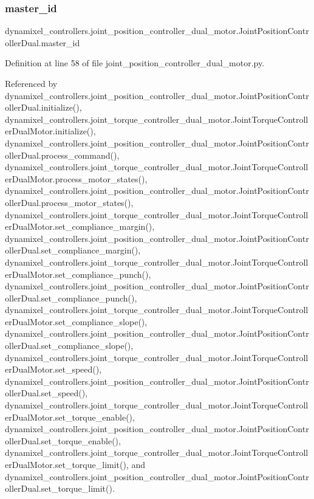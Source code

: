 \subsubsection{\texorpdfstring{master\+\_\+id}{master\_id}}
{\footnotesize\ttfamily dynamixel\+\_\+controllers.\+joint\+\_\+position\+\_\+controller\+\_\+dual\+\_\+motor.\+Joint\+Position\+Controller\+Dual.\+master\+\_\+id}



Definition at line 58 of file joint\+\_\+position\+\_\+controller\+\_\+dual\+\_\+motor.\+py.



Referenced by dynamixel\+\_\+controllers.\+joint\+\_\+position\+\_\+controller\+\_\+dual\+\_\+motor.\+Joint\+Position\+Controller\+Dual.\+initialize(), dynamixel\+\_\+controllers.\+joint\+\_\+torque\+\_\+controller\+\_\+dual\+\_\+motor.\+Joint\+Torque\+Controller\+Dual\+Motor.\+initialize(), dynamixel\+\_\+controllers.\+joint\+\_\+position\+\_\+controller\+\_\+dual\+\_\+motor.\+Joint\+Position\+Controller\+Dual.\+process\+\_\+command(), dynamixel\+\_\+controllers.\+joint\+\_\+torque\+\_\+controller\+\_\+dual\+\_\+motor.\+Joint\+Torque\+Controller\+Dual\+Motor.\+process\+\_\+motor\+\_\+states(), dynamixel\+\_\+controllers.\+joint\+\_\+position\+\_\+controller\+\_\+dual\+\_\+motor.\+Joint\+Position\+Controller\+Dual.\+process\+\_\+motor\+\_\+states(), dynamixel\+\_\+controllers.\+joint\+\_\+torque\+\_\+controller\+\_\+dual\+\_\+motor.\+Joint\+Torque\+Controller\+Dual\+Motor.\+set\+\_\+compliance\+\_\+margin(), dynamixel\+\_\+controllers.\+joint\+\_\+position\+\_\+controller\+\_\+dual\+\_\+motor.\+Joint\+Position\+Controller\+Dual.\+set\+\_\+compliance\+\_\+margin(), dynamixel\+\_\+controllers.\+joint\+\_\+torque\+\_\+controller\+\_\+dual\+\_\+motor.\+Joint\+Torque\+Controller\+Dual\+Motor.\+set\+\_\+compliance\+\_\+punch(), dynamixel\+\_\+controllers.\+joint\+\_\+position\+\_\+controller\+\_\+dual\+\_\+motor.\+Joint\+Position\+Controller\+Dual.\+set\+\_\+compliance\+\_\+punch(), dynamixel\+\_\+controllers.\+joint\+\_\+torque\+\_\+controller\+\_\+dual\+\_\+motor.\+Joint\+Torque\+Controller\+Dual\+Motor.\+set\+\_\+compliance\+\_\+slope(), dynamixel\+\_\+controllers.\+joint\+\_\+position\+\_\+controller\+\_\+dual\+\_\+motor.\+Joint\+Position\+Controller\+Dual.\+set\+\_\+compliance\+\_\+slope(), dynamixel\+\_\+controllers.\+joint\+\_\+torque\+\_\+controller\+\_\+dual\+\_\+motor.\+Joint\+Torque\+Controller\+Dual\+Motor.\+set\+\_\+speed(), dynamixel\+\_\+controllers.\+joint\+\_\+position\+\_\+controller\+\_\+dual\+\_\+motor.\+Joint\+Position\+Controller\+Dual.\+set\+\_\+speed(), dynamixel\+\_\+controllers.\+joint\+\_\+torque\+\_\+controller\+\_\+dual\+\_\+motor.\+Joint\+Torque\+Controller\+Dual\+Motor.\+set\+\_\+torque\+\_\+enable(), dynamixel\+\_\+controllers.\+joint\+\_\+position\+\_\+controller\+\_\+dual\+\_\+motor.\+Joint\+Position\+Controller\+Dual.\+set\+\_\+torque\+\_\+enable(), dynamixel\+\_\+controllers.\+joint\+\_\+torque\+\_\+controller\+\_\+dual\+\_\+motor.\+Joint\+Torque\+Controller\+Dual\+Motor.\+set\+\_\+torque\+\_\+limit(), and dynamixel\+\_\+controllers.\+joint\+\_\+position\+\_\+controller\+\_\+dual\+\_\+motor.\+Joint\+Position\+Controller\+Dual.\+set\+\_\+torque\+\_\+limit().

